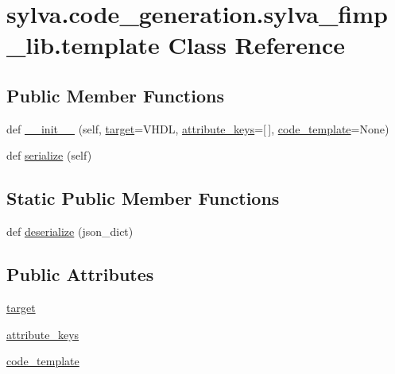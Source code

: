 \hypertarget{classsylva_1_1code__generation_1_1sylva__fimp__lib_1_1template}{}\section{sylva.\+code\+\_\+generation.\+sylva\+\_\+fimp\+\_\+lib.\+template Class Reference}
\label{classsylva_1_1code__generation_1_1sylva__fimp__lib_1_1template}
\subsection*{Public Member Functions}
\begin{DoxyCompactItemize}
\item 
def \hyperlink{classsylva_1_1code__generation_1_1sylva__fimp__lib_1_1template_a6d4b9e1d30b442c89fc9523b669670f8}{\+\_\+\+\_\+init\+\_\+\+\_\+} (self, \hyperlink{classsylva_1_1code__generation_1_1sylva__fimp__lib_1_1template_a406dc0282db6a1ae647d7b4ff3f21cd5}{target}=\textquotesingle{}V\+H\+DL\textquotesingle{}, \hyperlink{classsylva_1_1code__generation_1_1sylva__fimp__lib_1_1template_a1758881052bbbaecc550bf8796813ea0}{attribute\+\_\+keys}=\mbox{[}$\,$\mbox{]}, \hyperlink{classsylva_1_1code__generation_1_1sylva__fimp__lib_1_1template_a3eb675d502d5f289d057ae53326b69e0}{code\+\_\+template}=None)
\item 
def \hyperlink{classsylva_1_1code__generation_1_1sylva__fimp__lib_1_1template_a0da717e4feb8a6344c0aae89f4beab2a}{serialize} (self)
\end{DoxyCompactItemize}
\subsection*{Static Public Member Functions}
\begin{DoxyCompactItemize}
\item 
def \hyperlink{classsylva_1_1code__generation_1_1sylva__fimp__lib_1_1template_ac648764b728d04c28165f82f882b8368}{deserialize} (json\+\_\+dict)
\end{DoxyCompactItemize}
\subsection*{Public Attributes}
\begin{DoxyCompactItemize}
\item 
\hyperlink{classsylva_1_1code__generation_1_1sylva__fimp__lib_1_1template_a406dc0282db6a1ae647d7b4ff3f21cd5}{target}
\item 
\hyperlink{classsylva_1_1code__generation_1_1sylva__fimp__lib_1_1template_a1758881052bbbaecc550bf8796813ea0}{attribute\+\_\+keys}
\item 
\hyperlink{classsylva_1_1code__generation_1_1sylva__fimp__lib_1_1template_a3eb675d502d5f289d057ae53326b69e0}{code\+\_\+template}
\end{DoxyCompactItemize}


